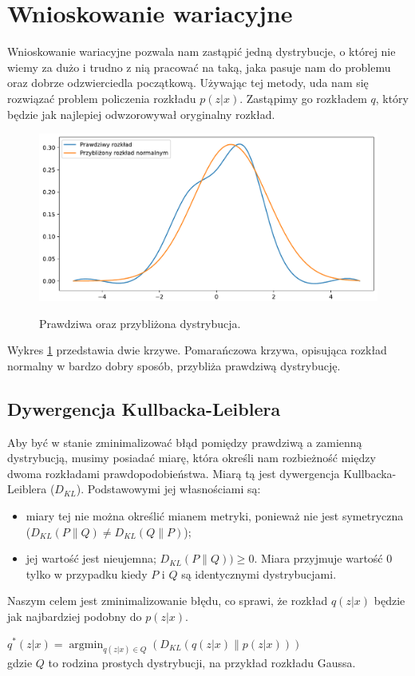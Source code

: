 \documentclass[a4paper,12pt,oneside]{book} %
\begin{document}
\section{Wnioskowanie wariacyjne}
Wnioskowanie wariacyjne pozwala nam zastąpić jedną dystrybucje, o której nie wiemy za dużo i trudno z nią pracować na taką, jaka pasuje nam do problemu oraz dobrze odzwierciedla początkową. Używając tej metody, uda nam się rozwiązać problem policzenia rozkładu $p(z|x)$. Zastąpimy go rozkładem $q$, który będzie jak najlepiej odwzorowywał oryginalny rozkład. 
\begin{figure}[h!]
	\centering
	\includegraphics[width=12cm]{approximate.pdf}
	\label{fig:approximate}
	\caption{Prawdziwa oraz przybliżona dystrybucja.}
\end{figure} 

Wykres \ref{fig:approximate} przedstawia dwie krzywe. Pomarańczowa krzywa, opisująca rozkład normalny w bardzo dobry sposób, przybliża prawdziwą dystrybucję.
\subsection{Dywergencja Kullbacka-Leiblera}
Aby być w stanie zminimalizować błąd pomiędzy prawdziwą a zamienną dystrybucją, musimy posiadać miarę, która określi nam rozbieżność między dwoma rozkładami prawdopodobieństwa. Miarą tą jest dywergencja Kullbacka-Leiblera ($D_{KL}$). Podstawowymi jej własnościami są:
\begin{itemize}
	\item miary tej nie można określić mianem metryki, ponieważ nie jest symetryczna ($D_{KL}(P\|Q)\neq D_{KL}(Q\|P)$);
	\item jej wartość jest nieujemna; $D_{KL}(P\|Q)) \geq 0$. Miara przyjmuje wartość 0 tylko w przypadku kiedy $P$ i $Q$ są identycznymi dystrybucjami.
\end{itemize}
Naszym celem jest zminimalizowanie błędu, co sprawi, że rozkład $q(z|x)$ będzie jak najbardziej podobny do $p(z|x)$.
\begin{center}
	$q^\ast(z|x)=\operatorname*{argmin}_{q(z|x)\in Q}(D_{KL}(q(z|x)\|p(z|x)))$
	\\gdzie $Q$ to rodzina prostych dystrybucji, na przykład rozkładu Gaussa.
\end{center}
\end{document}
